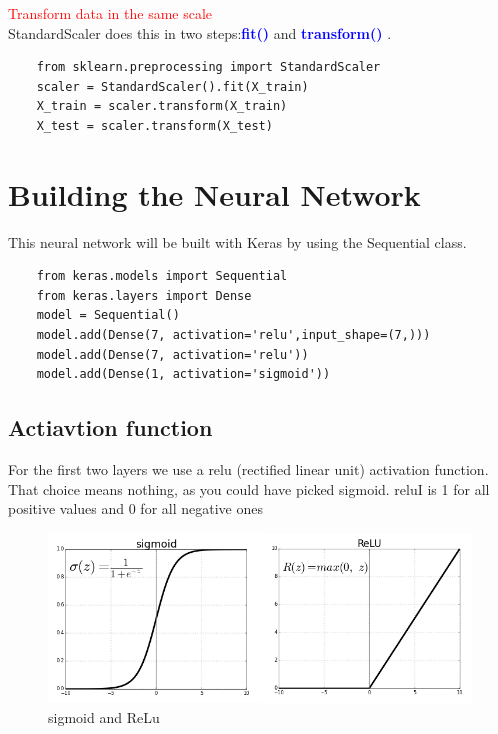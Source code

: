 \textcolor{red}{Transform data in the same scale}\\
StandardScaler does this in two steps:\textcolor{blue}{\textbf{fit()}} and \textcolor{blue}{\textbf{transform()} }.\\

\begin{lstlisting}
    from sklearn.preprocessing import StandardScaler
    scaler = StandardScaler().fit(X_train)
    X_train = scaler.transform(X_train)
    X_test = scaler.transform(X_test) 
\end{lstlisting}


\section{Building the Neural Network}
\label{chap:approach}
This neural network will be built with Keras by using the Sequential class.

\begin{lstlisting}
    from keras.models import Sequential
    from keras.layers import Dense
    model = Sequential()
    model.add(Dense(7, activation='relu',input_shape=(7,)))
    model.add(Dense(7, activation='relu'))
    model.add(Dense(1, activation='sigmoid'))   
\end{lstlisting}
\subsection{Actiavtion function}
\label{sec:Actiavtion function}
    For the first two layers we use a relu (rectified linear unit) activation function.
     That choice means nothing, as you could have picked sigmoid.
    reluI is 1 for all positive values and 0 for all negative ones
  
    \newpage

    \begin{figure}[htp]
        \centering
        \includegraphics[width=1.1\textwidth]{images/sigmoid.png }
        \caption{sigmoid and ReLu }
        \label{fig:example4}
    \end{figure}
  
